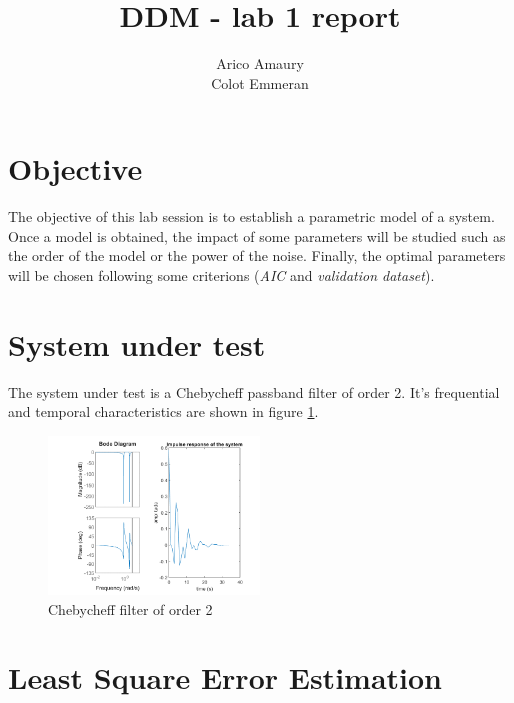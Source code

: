 \documentclass[10pt,twocolumn]{article}
\title{DDM - lab 1 report}
\author{Arico Amaury\\Colot Emmeran}
\date{}
\begin{document}
\maketitle

\section{Objective}
The objective of this lab session is to establish a parametric model of a system. Once a model is obtained, the impact of some parameters will be studied such as the order of the model or the power of the noise. Finally, the optimal parameters will be chosen following some criterions (\textit{AIC} and \textit{validation dataset}).

\section{System under test}

The system under test is a Chebycheff passband filter of order 2. It's frequential and temporal characteristics are shown in figure \ref{fig:chebycheff}. 

\begin{figure}
    \centering
    \includegraphics[width=0.5\textwidth]{pic/filterCaracteristics.png}
    \caption{Chebycheff filter of order 2}
    \label{fig:chebycheff}
\end{figure}

\section{Least Square Error Estimation}
\end{document}
